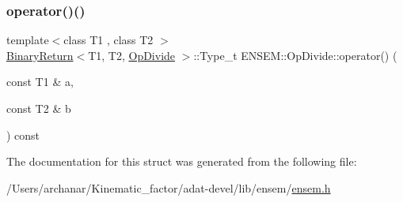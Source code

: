 \subsubsection{\texorpdfstring{operator()()}{operator()()}\hspace{0.1cm}{\footnotesize\ttfamily [3/3]}}
{\footnotesize\ttfamily template$<$class T1 , class T2 $>$ \\
\mbox{\hyperlink{structENSEM_1_1BinaryReturn}{Binary\+Return}}$<$T1, T2, \mbox{\hyperlink{structENSEM_1_1OpDivide}{Op\+Divide}} $>$\+::Type\+\_\+t E\+N\+S\+E\+M\+::\+Op\+Divide\+::operator() (\begin{DoxyParamCaption}\item[{const T1 \&}]{a,  }\item[{const T2 \&}]{b }\end{DoxyParamCaption}) const\hspace{0.3cm}{\ttfamily [inline]}}



The documentation for this struct was generated from the following file\+:\begin{DoxyCompactItemize}
\item 
/\+Users/archanar/\+Kinematic\+\_\+factor/adat-\/devel/lib/ensem/\mbox{\hyperlink{adat-devel_2lib_2ensem_2ensem_8h}{ensem.\+h}}\end{DoxyCompactItemize}
